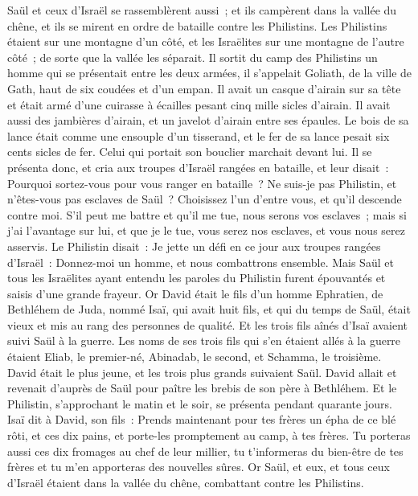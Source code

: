 \begin{multicols}{2}
Saül et ceux d'Israël se rassemblèrent aussi~; et ils campèrent dans la vallée du chêne, et ils se mirent en ordre de bataille contre les Philistins.
Les Philistins étaient sur une montagne d'un côté, et les Israëlites sur une montagne de l'autre côté~; de sorte que la vallée les séparait.
Il sortit du camp des Philistins un homme qui se présentait entre les deux armées, il s'appelait Goliath, de la ville de Gath, haut de six coudées et d'un empan.
Il avait un casque d'airain sur sa tête et était armé d'une cuirasse à écailles pesant cinq mille sicles d'airain.
Il avait aussi des jambières d'airain, et un javelot d'airain entre ses épaules.
Le bois de sa lance était comme une ensouple d'un tisserand, et le fer de sa lance pesait six cents sicles de fer. Celui qui portait son bouclier marchait devant lui.
Il se présenta donc, et cria aux troupes d'Israël rangées en bataille, et leur disait~: Pourquoi sortez-vous pour vous ranger en bataille~? Ne suis-je pas Philistin, et n'êtes-vous pas esclaves de Saül~? Choisissez l'un d'entre vous, et qu'il descende contre moi.
S'il peut me battre et qu'il me tue, nous serons vos esclaves~; mais si j'ai l'avantage sur lui, et que je le tue, vous serez nos esclaves, et vous nous serez asservis.
Le Philistin disait~: Je jette un défi en ce jour aux troupes rangées d'Israël~: Donnez-moi un homme, et nous combattrons ensemble.
Mais Saül et tous les Israëlites ayant entendu les paroles du Philistin furent épouvantés et saisis d'une grande frayeur.
Or David était le fils d'un homme Ephratien, de Bethléhem de Juda, nommé Isaï, qui avait huit fils, et qui du temps de Saül, était vieux et mis au rang des personnes de qualité.
Et les trois fils aînés d'Isaï avaient suivi Saül à la guerre. Les noms de ses trois fils qui s'en étaient allés à la guerre étaient Eliab, le premier-né, Abinadab, le second, et Schamma, le troisième.
David était le plus jeune, et les trois plus grands suivaient Saül.
David allait et revenait d'auprès de Saül pour paître les brebis de son père à Bethléhem.
Et le Philistin, s'approchant le matin et le soir, se présenta pendant quarante jours.
Isaï dit à David, son fils~: Prends maintenant pour tes frères un épha de ce blé rôti, et ces dix pains, et porte-les promptement au camp, à tes frères.
Tu porteras aussi ces dix fromages au chef de leur millier, tu t'informeras du bien-être de tes frères et tu m'en apporteras des nouvelles sûres.
Or Saül, et eux, et tous ceux d'Israël étaient dans la vallée du chêne, combattant contre les Philistins.

\end{multicols}
